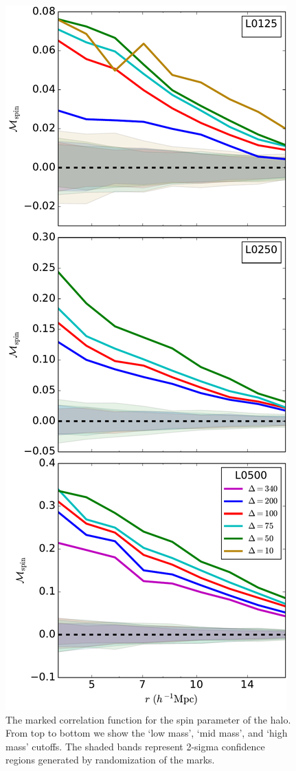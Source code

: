\documentclass[usenatbib,usegraphicx,letterpaper]{mn2e}
\begin{document}
\begin{figure}
	\centering
	\includegraphics[width=.4\textwidth]{all_mcf_spin.pdf}
	\caption{The marked correlation function for the spin parameter of the halo. From top to bottom we show the `low mass', `mid mass', and `high mass' cutoffs. The shaded bands represent 2-sigma confidence regions generated by randomization of the marks.
	}
	\label{fig:cc_mcf_spin}
\end{figure}
\end{document}
